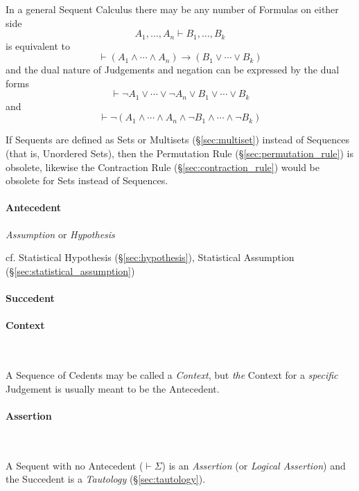 In a general Sequent Calculus there may be any number of Formulas on
either side
\[
  A_1, \ldots, A_n \vdash B_1, \ldots, B_k
\]
is equivalent to
\[
  \vdash(A_1 \wedge \cdots \wedge A_n) \rightarrow
  (B_1 \vee \cdots \vee B_k)
\]
and the dual nature of Judgements and negation can be expressed by the
dual forms
\[
  \vdash \neg A_1 \vee \cdots \vee \neg A_n \vee B_1 \vee \cdots
  \vee B_k
\]
and
\[
  \vdash \neg(A_1 \wedge \cdots \wedge A_n \wedge \neg B_1 \wedge
  \cdots \wedge \neg B_k)
\]

If Sequents are defined as Sets or Multisets (\S\ref{sec:multiset})
instead of Sequences (that is, Unordered Sets), then the Permutation
Rule (\S\ref{sec:permutation_rule}) is obsolete, likewise the
Contraction Rule (\S\ref{sec:contraction_rule}) would be obsolete for
Sets instead of Sequences.



\paragraph{Antecedent}\label{sec:antecedent}\hfill

\emph{Assumption} or \emph{Hypothesis}

\fist cf. Statistical Hypothesis (\S\ref{sec:hypothesis}), Statistical
Assumption (\S\ref{sec:statistical_assumption})



\paragraph{Succedent}\label{sec:succedent}\hfill

\paragraph{Context}\label{sec:sequent_context} \hfill \\\hfill

A Sequence of Cedents may be called a \emph{Context}, but \emph{the}
Context for a \emph{specific} Judgement is usually meant to be the
Antecedent.



\paragraph{Assertion}\label{sec:assertion} \hfill \\\hfill

A Sequent with no Antecedent ($\vdash \Sigma$) is an \emph{Assertion} (or
\emph{Logical Assertion}) and the Succedent is a \emph{Tautology}
(\S\ref{sec:tautology}).

